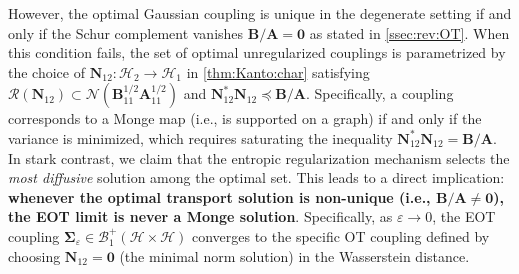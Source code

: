 \documentclass[noinfoline]{imsart}\setcounter{tocdepth}{2}
\newcommand{\m}[1]{\mathbf{#1}}
\renewcommand{\c}[1]{\mathcal{#1}}
\theoremstyle{plain}
\begin{document}
However, the optimal Gaussian coupling is unique in the degenerate setting if and only if the Schur complement vanishes $\m{B}/\m{A} = \m{0}$ as stated in \cref{ssec:rev:OT}. When this condition fails, the set of optimal unregularized couplings is parametrized by the choice of $\m{N}_{{12}}  : \c{H}_{2} \to \c{H}_{1}$ in \cref{thm:Kanto:char} satisfying $\c{R}(\m{N}_{{12}}) \subset \c{N}(\m{B}_{{11}}^{1/2} \m{A}_{{11}}^{1/2})$ and $\m{N}_{{12}}^{*} \m{N}_{{12}} \preceq \m{B}/\m{A}$. Specifically, a coupling corresponds to a Monge map (i.e., is supported on a graph) if and only if the variance is minimized, which requires saturating the inequality $\m{N}_{{12}}^{*} \m{N}_{{12}} = \m{B}/\m{A}$.
In stark contrast, we claim that the entropic regularization mechanism selects the \emph{most diffusive} solution among the optimal set. This leads to a direct implication: \textbf{whenever the optimal transport solution is non-unique (i.e., $\m{B}/\m{A} \ne \m{0}$), the EOT limit is never a Monge solution}. Specifically, as $\varepsilon \to 0$, the EOT coupling $\m{\Sigma}_{\varepsilon} \in \c{B}_{1}^{+}(\c{H} \times \c{H})$ converges to the specific OT coupling defined by choosing $\m{N}_{{12}} = \m{0}$ (the minimal norm solution) in the Wasserstein distance.
\end{document}
